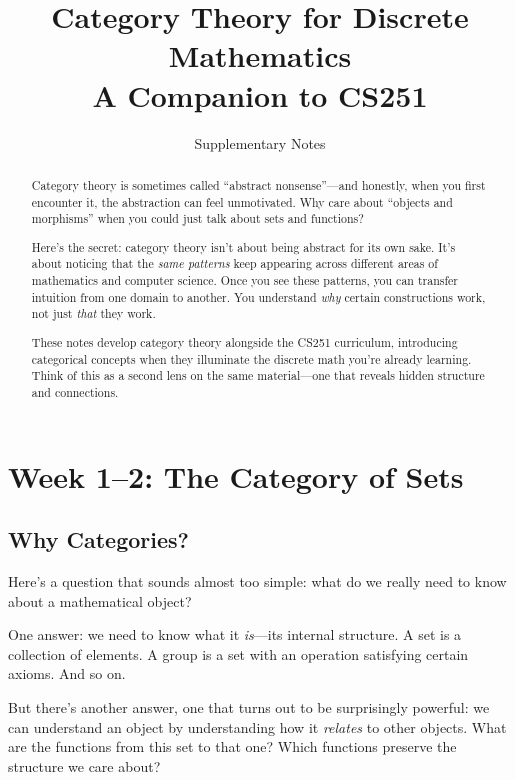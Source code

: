 \documentclass[11pt]{article}
\theoremstyle{definition}
\theoremstyle{plain}
\theoremstyle{remark}
\begin{document}
\title{Category Theory for Discrete Mathematics\\[0.5em]\large A Companion to CS251}
\author{Supplementary Notes}
\date{}
\maketitle

\begin{abstract}
Category theory is sometimes called ``abstract nonsense''---and honestly, when you first encounter it, the abstraction can feel unmotivated. Why care about ``objects and morphisms'' when you could just talk about sets and functions?

Here's the secret: category theory isn't about being abstract for its own sake. It's about noticing that the \emph{same patterns} keep appearing across different areas of mathematics and computer science. Once you see these patterns, you can transfer intuition from one domain to another. You understand \emph{why} certain constructions work, not just \emph{that} they work.

These notes develop category theory alongside the CS251 curriculum, introducing categorical concepts when they illuminate the discrete math you're already learning. Think of this as a second lens on the same material---one that reveals hidden structure and connections.
\end{abstract}

\tableofcontents
\newpage

\section{Week 1--2: The Category of Sets}

\subsection*{Why Categories?}

Here's a question that sounds almost too simple: what do we really need to know about a mathematical object?

One answer: we need to know what it \emph{is}---its internal structure. A set is a collection of elements. A group is a set with an operation satisfying certain axioms. And so on.

But there's another answer, one that turns out to be surprisingly powerful: we can understand an object by understanding how it \emph{relates} to other objects. What are the functions from this set to that one? Which functions preserve the structure we care about?
\end{document}
